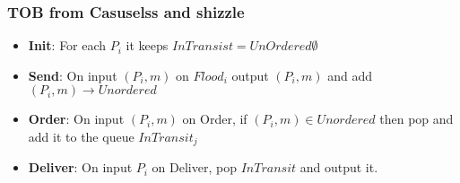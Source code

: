         \begin{frame}
            \frametitle{TOB from Casuselss and shizzle}
                \begin{itemize}
                    \item \textbf{Init}: For each $P_i$ it keeps $InTransist = UnOrdered \emptyset$
                    \item \textbf{Send}: On input $(P_i, m)$ on $Flood_i$ output $(P_i, m)$ and add $(P_i, m) \rightarrow Unordered$
                    \item \textbf{Order}: On input $(P_i, m)$ on Order, if $(P_i, m) \in Unordered$ then pop and add it to the queue $InTransit_j$
                    \item \textbf{Deliver}: On input $P_i$ on Deliver, pop $InTransit$ and output it.   
                \end{itemize}
            
        
        \end{frame}



